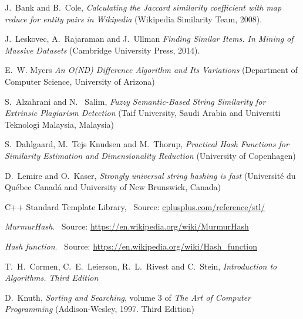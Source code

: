 \documentclass[12pt]{article}
\begin{document}
{\begin{enumerate}
\end{enumerate}


\clearpage
\begin{thebibliography}{100}

J.\ Bank and B.\ Cole,
\textit {Calculating the Jaccard similarity coefficient with map reduce for entity pairs in
Wikipedia} (Wikipedia Similarity Team, 2008).

J.\ Leskovec, A.\ Rajaraman and J.\ Ullman
\textit{ Finding Similar Items. In Mining of Massive Datasets} (Cambridge University Press, 2014).

E.\ W. Myers \textit{An O(ND) Difference Algorithm and Its Variations} (Department of Computer Science, University of Arizona)

S.\ Alzahrani and N. \ Salim, \textit{Fuzzy Semantic-Based String Similarity for Extrinsic Plagiarism Detection} (Taif University, Saudi Arabia and Universiti Teknologi Malaysia, Malaysia)

S.\ Dahlgaard, M.\ Tejs Knudsen and M.\ Thorup, \textit{Practical Hash Functions for Similarity Estimation and Dimensionality Reduction} (University of Copenhagen)

D.\ Lemire and O.\ Kaser, \textit{Strongly universal string hashing is fast} (Université du Québec Canadá and University of New Brunswick, Canada) 

C++ Standard Template Library,
\ Source: \url{cplusplus.com/reference/stl/}




\textit{MurmurHash}. \ Source: \url{https://en.wikipedia.org/wiki/MurmurHash}

\textit{Hash function}. \ Source: \url{https://en.wikipedia.org/wiki/Hash_function}

T.\ H.\ Cormen, C.\ E.\ Leierson, R.\ L.\ Rivest and C.\ Stein, \textit{Introduction to Algorithms. Third Edition}

D.\ Knuth,
\textit {Sorting and Searching}, volume 3 of \textit{The Art of Computer Programming} (Addison-Wesley, 1997. Third Edition)



\end{thebibliography}}
\end{document}
